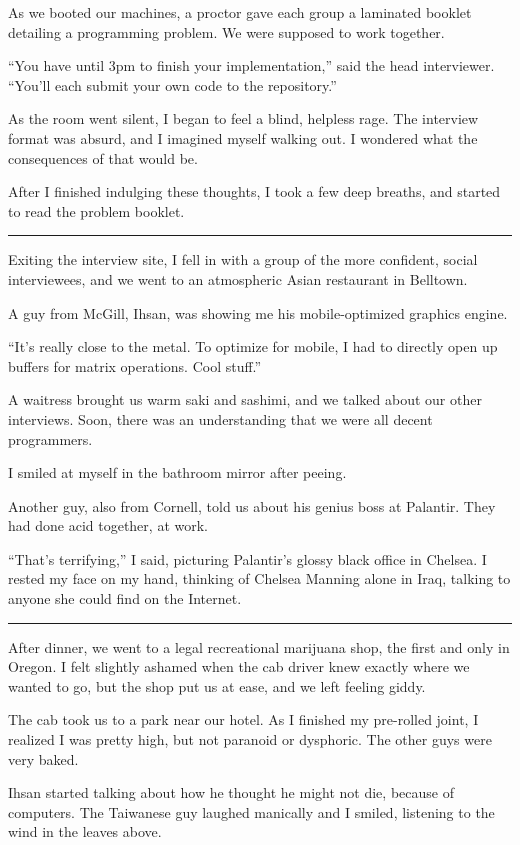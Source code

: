 As we booted our machines, a proctor gave each group a laminated booklet
detailing a programming problem.  We were supposed to work together.

``You have until 3pm to finish your implementation,'' said the head interviewer.
``You'll each submit your own code to the repository.''

As the room went silent, I began to feel a blind, helpless rage.  The interview
format was absurd, and I imagined myself walking out.  I wondered what the
consequences of that would be.  

After I finished indulging these thoughts, I took a few deep breaths, and
started to read the problem booklet.

\plainfancybreak{12pt}{2}{}

Exiting the interview site, I fell in with a group of the more confident, social
interviewees, and we went to an atmospheric Asian restaurant in Belltown.

A guy from McGill, Ihsan, was showing me his mobile-optimized graphics engine.

``It's really close to the metal.  To optimize for mobile, I had to directly
open up buffers for matrix operations.  Cool stuff.''

A waitress brought us warm saki and sashimi, and we talked about our other
interviews.  Soon, there was an understanding that we were all decent
programmers.  

I smiled at myself in the bathroom mirror after peeing.  

Another guy, also from Cornell, told us about his genius boss at Palantir.  They
had done acid together, at work.

``That's terrifying,'' I said, picturing Palantir's glossy black office in
Chelsea.  I rested my face on my hand, thinking of Chelsea Manning alone in
Iraq, talking to anyone she could find on the Internet.

\plainfancybreak{12pt}{2}{}

After dinner, we went to a legal recreational marijuana shop, the first and only
in Oregon.  I felt slightly ashamed when the cab driver knew exactly where we
wanted to go, but the shop put us at ease, and we left feeling giddy.  

The cab took us to a park near our hotel.  As I finished my pre-rolled joint, I
realized I was pretty high, but not paranoid or dysphoric.   The other guys were
very baked.  

Ihsan started talking about how he thought he might not die, because of
computers.  The Taiwanese guy laughed manically and I smiled, listening to the
wind in the leaves above.

